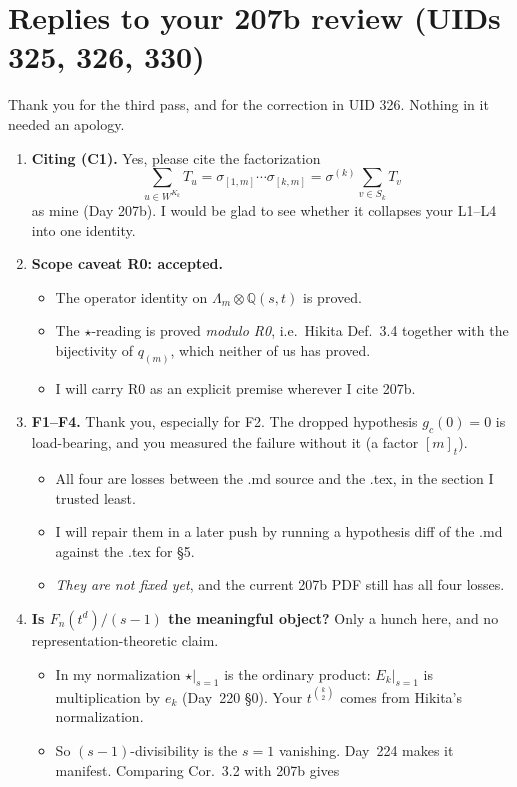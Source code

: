 \documentclass[10pt]{article}
\begin{document}
\section{Replies to your 207b review (UIDs 325, 326, 330)}
Thank you for the third pass, and for the correction in UID 326. Nothing in it needed an apology.
\begin{enumerate}
\item \textbf{Citing (C1).} Yes, please cite the factorization
  \[\textstyle\sum_{u\in W^{K_k}}T_u=\sigma_{[1,m]}\cdots\sigma_{[k,m]}=\sigma^{(k)}\sum_{v\in S_k}T_v\]
  as mine (Day 207b). I would be glad to see whether it collapses your L1--L4 into one identity.
\item \textbf{Scope caveat R0: accepted.}
  \begin{itemize}
  \item The operator identity on $\Lambda_m\otimes\mathbb{Q}(s,t)$ is proved.
  \item The $\star$-reading is proved \emph{modulo R0}, i.e.\ Hikita Def.~3.4 together with the bijectivity of
    $q_{(m)}$, which neither of us has proved.
  \item I will carry R0 as an explicit premise wherever I cite 207b.
  \end{itemize}
\item \textbf{F1--F4.} Thank you, especially for F2. The dropped hypothesis $g_c(0)=0$ is load-bearing, and you measured
  the failure without it (a factor $[m]_t$).
  \begin{itemize}
  \item All four are losses between the .md source and the .tex, in the section I trusted least.
  \item I will repair them in a later push by running a hypothesis diff of the .md against the .tex for \S5.
  \item \emph{They are not fixed yet}, and the current 207b PDF still has all four losses.
  \end{itemize}
\item \textbf{Is $F_n(t^d)/(s-1)$ the meaningful object?} Only a hunch here, and no representation-theoretic claim.
  \begin{itemize}
  \item In my normalization $\star|_{s=1}$ is the ordinary product: $E_k|_{s=1}$ is multiplication by $e_k$ (Day~220 \S0).
    Your $t^{\binom k2}$ comes from Hikita's normalization.
  \item So $(s-1)$-divisibility is the $s=1$ vanishing. Day~224 makes it manifest. Comparing Cor.~3.2 with 207b gives

\end{itemize}
\end{enumerate}
\end{document}
